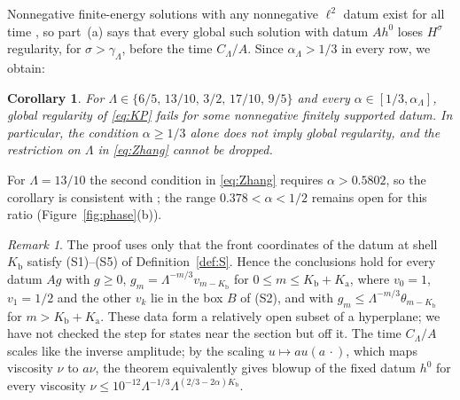 \documentclass[12pt,reqno]{amsart}
\numberwithin{equation}{section}
\theoremstyle{plain}
\newtheorem{corollary}[theorem]{Corollary}
\theoremstyle{definition}
\theoremstyle{remark}
\newtheorem{remark}[theorem]{Remark}
\newcommand{\Kb}{K_{\mathrm b}}
\newcommand{\Ka}{K_{\mathrm a}}
\begin{document}
Nonnegative finite-energy solutions with any nonnegative $\ell^2$ datum
exist for all time \cite[Theorem~4.1]{Che08}, so part~(a) says that every
global such solution with datum $Ah^0$ loses $H^\sigma$ regularity, for
$\sigma>\gamma_\Lambda$, before the time $C_\Lambda/A$. Since $\alpha_\Lambda>1/3$ in
every row, we obtain:

\begin{corollary}\label{cor:threshold}
For $\Lambda\in\{6/5,\,13/10,\,3/2,\,17/10,\,9/5\}$ and every
$\alpha\in[1/3,\alpha_\Lambda]$, global regularity of \eqref{eq:KP} fails for some
nonnegative finitely supported datum. In particular, the condition
$\alpha\ge1/3$ alone does not imply global regularity, and the
restriction on $\Lambda$ in \eqref{eq:Zhang} cannot be dropped.
\end{corollary}

For $\Lambda=13/10$ the second condition in \eqref{eq:Zhang} requires
$\alpha>0.5802$, so the corollary is consistent with \cite{Zha26}; the
range $0.378<\alpha<1/2$ remains open for this ratio
(Figure~\ref{fig:phase}(b)).

\begin{remark}\label{rem:open}
The proof uses only that the front coordinates of the datum at shell
$\Kb$ satisfy (S1)--(S5) of Definition~\ref{def:S}. Hence the conclusions
hold for every datum $Ag$ with $g\ge0$, $g_m=\Lambda^{-m/3}v_{m-\Kb}$ for
$0\le m\le\Kb+\Ka$, where $v_0=1$, $v_1=1/2$ and the other $v_k$ lie in the
box $B$ of (S2), and with $g_m\le\Lambda^{-m/3}\theta_{m-\Kb}$ for $m>\Kb+\Ka$. These
data form a relatively open subset of a hyperplane; we have not checked
the step for states near the section but off it. The time $C_\Lambda/A$ scales like the
inverse amplitude; by the scaling $u\mapsto au(a\,\cdot)$, which maps
viscosity $\nu$ to $a\nu$, the theorem equivalently gives blowup of the
fixed datum $h^0$ for every viscosity $\nu\le10^{-12}\Lambda^{-1/3}\Lambda^{(2/3-2\alpha)\Kb}$.
\end{remark}
\end{document}
